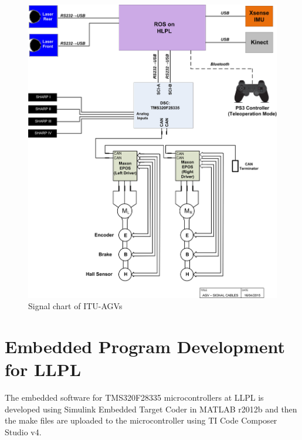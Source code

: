\begin{figure}[h]
	\centering
	\includegraphics[scale=0.45]{images/agvSignal}
	\caption{Signal chart of ITU-AGVs}
	\label{fig:agvSignal}
\end{figure}

\section{Embedded Program Development for LLPL}
\label{sec:embedded dev}
The embedded software for TMS320F28335 microcontrollers at LLPL is developed using Simulink Embedded Target Coder in MATLAB r2012b and then the make files are uploaded to the microcontroller using TI Code Composer Studio v4. 
